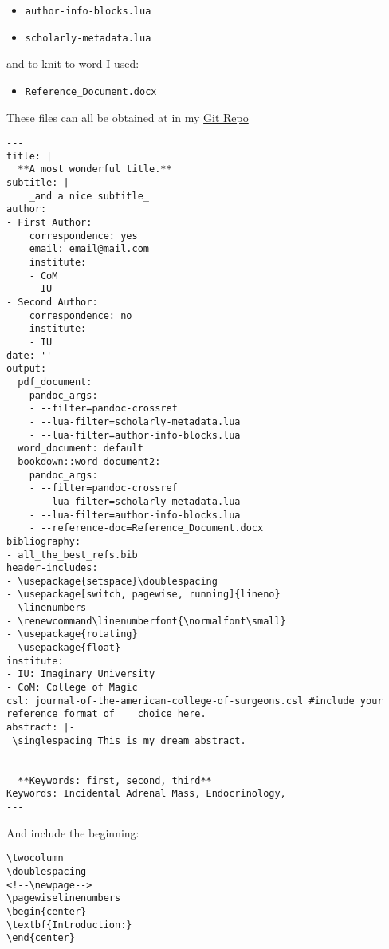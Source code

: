 \documentclass[
]{article}
\providecommand{\tightlist}{%
  \setlength{\itemsep}{0pt}\setlength{\parskip}{0pt}}
\begin{document}
\begin{itemize}
\tightlist
\item
  \texttt{author-info-blocks.lua}
\item
  \texttt{scholarly-metadata.lua}
\end{itemize}

and to knit to word I used:

\begin{itemize}
\tightlist
\item
  \texttt{Reference\_Document.docx}
\end{itemize}

These files can all be obtained at in my
\href{https://github.com/tpfeeney/academic_paper_in_markdown/tree/master/augmented_yaml}{Git
Repo}

\begin{verbatim}
---
title: |
  **A most wonderful title.**
subtitle: |
    _and a nice subtitle_
author:
- First Author:
    correspondence: yes
    email: email@mail.com
    institute:
    - CoM
    - IU
- Second Author:
    correspondence: no
    institute:
    - IU
date: ''
output:
  pdf_document:
    pandoc_args:
    - --filter=pandoc-crossref
    - --lua-filter=scholarly-metadata.lua
    - --lua-filter=author-info-blocks.lua
  word_document: default
  bookdown::word_document2:
    pandoc_args:
    - --filter=pandoc-crossref
    - --lua-filter=scholarly-metadata.lua
    - --lua-filter=author-info-blocks.lua
    - --reference-doc=Reference_Document.docx
bibliography:
- all_the_best_refs.bib
header-includes:
- \usepackage{setspace}\doublespacing
- \usepackage[switch, pagewise, running]{lineno}
- \linenumbers
- \renewcommand\linenumberfont{\normalfont\small}
- \usepackage{rotating}
- \usepackage{float}
institute:
- IU: Imaginary University
- CoM: College of Magic
csl: journal-of-the-american-college-of-surgeons.csl #include your reference format of    choice here.
abstract: |-
 \singlespacing This is my dream abstract. 
  
  
  **Keywords: first, second, third**
Keywords: Incidental Adrenal Mass, Endocrinology,
---
\end{verbatim}

And include the beginning:

\begin{verbatim}
\twocolumn
\doublespacing
<!--\newpage-->
\pagewiselinenumbers
\begin{center}
\textbf{Introduction:}
\end{center}
\end{verbatim}
\end{document}
